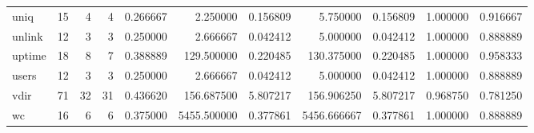 \begin{longtable}{lrrrrrrrrrr}
uniq      &                                      15 &                  4 &                                 4 &                                   0.266667 &                               2.250000 &                                     0.156809 &                          5.750000 &                                0.156809 &                           1.000000 &                                           0.916667 \\
unlink    &                                      12 &                  3 &                                 3 &                                   0.250000 &                               2.666667 &                                     0.042412 &                          5.000000 &                                0.042412 &                           1.000000 &                                           0.888889 \\
uptime    &                                      18 &                  8 &                                 7 &                                   0.388889 &                             129.500000 &                                     0.220485 &                        130.375000 &                                0.220485 &                           1.000000 &                                           0.958333 \\
users     &                                      12 &                  3 &                                 3 &                                   0.250000 &                               2.666667 &                                     0.042412 &                          5.000000 &                                0.042412 &                           1.000000 &                                           0.888889 \\
vdir      &                                      71 &                 32 &                                31 &                                   0.436620 &                             156.687500 &                                     5.807217 &                        156.906250 &                                5.807217 &                           0.968750 &                                           0.781250 \\
wc        &                                      16 &                  6 &                                 6 &                                   0.375000 &                            5455.500000 &                                     0.377861 &                       5456.666667 &                                0.377861 &                           1.000000 &                                           0.888889 \\

\end{longtable}
